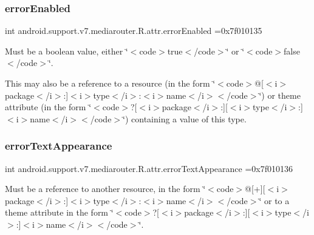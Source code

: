 \subsubsection{\texorpdfstring{error\+Enabled}{errorEnabled}}
{\footnotesize\ttfamily int android.\+support.\+v7.\+mediarouter.\+R.\+attr.\+error\+Enabled =0x7f010135\hspace{0.3cm}{\ttfamily [static]}}

Must be a boolean value, either \char`\"{}$<$code$>$true$<$/code$>$\char`\"{} or \char`\"{}$<$code$>$false$<$/code$>$\char`\"{}. 

This may also be a reference to a resource (in the form \char`\"{}$<$code$>$@\mbox{[}$<$i$>$package$<$/i$>$\+:\mbox{]}$<$i$>$type$<$/i$>$\+:$<$i$>$name$<$/i$>$$<$/code$>$\char`\"{}) or theme attribute (in the form \char`\"{}$<$code$>$?\mbox{[}$<$i$>$package$<$/i$>$\+:\mbox{]}\mbox{[}$<$i$>$type$<$/i$>$\+:\mbox{]}$<$i$>$name$<$/i$>$$<$/code$>$\char`\"{}) containing a value of this type. \mbox{\label{classandroid_1_1support_1_1v7_1_1mediarouter_1_1R_1_1attr_a5c73f4d61559470e6b21c11c6d850bc4}} 
\subsubsection{\texorpdfstring{error\+Text\+Appearance}{errorTextAppearance}}
{\footnotesize\ttfamily int android.\+support.\+v7.\+mediarouter.\+R.\+attr.\+error\+Text\+Appearance =0x7f010136\hspace{0.3cm}{\ttfamily [static]}}

Must be a reference to another resource, in the form \char`\"{}$<$code$>$@\mbox{[}+\mbox{]}\mbox{[}$<$i$>$package$<$/i$>$\+:\mbox{]}$<$i$>$type$<$/i$>$\+:$<$i$>$name$<$/i$>$$<$/code$>$\char`\"{} or to a theme attribute in the form \char`\"{}$<$code$>$?\mbox{[}$<$i$>$package$<$/i$>$\+:\mbox{]}\mbox{[}$<$i$>$type$<$/i$>$\+:\mbox{]}$<$i$>$name$<$/i$>$$<$/code$>$\char`\"{}. \mbox{\label{classandroid_1_1support_1_1v7_1_1mediarouter_1_1R_1_1attr_ad172cad171d05a0da03a6b639907da78}} 
